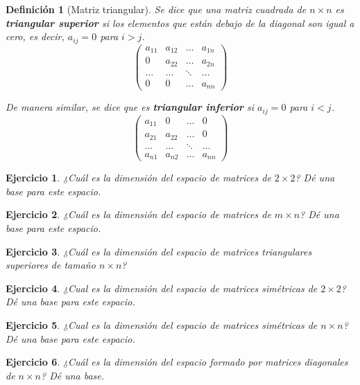 \documentclass[11pt]{report}
\theoremstyle{break}
\newtheorem{definicion}{Definición}[chapter]
\newtheorem{ejercicio}{Ejercicio}[chapter]
\theoremstyle{break}
\newcommand{\matdim}[2]{$#1 \times #2$}
\begin{document}
\begin{definicion}[Matriz triangular]
Se dice que una matriz cuadrada de \matdim{n}{n} es \textbf{triangular superior} si los elementos que están debajo de la diagonal son igual a cero, es decir, $a_{ij} = 0$ para $i > j$.
$$
\begin{pmatrix}
a_{11} & a_{12} & \ldots & a_{1n} \\
0 & a_{22} & \ldots & a_{2n} \\
\ldots & \ldots & \ddots & \ldots \\
0 & 0 & \ldots & a_{nn}
\end{pmatrix}
$$

De manera similar, se dice que es \textbf{triangular inferior} si $a_{ij} = 0$ para $i < j$.
$$
\begin{pmatrix}
a_{11} & 0 & \ldots & 0 \\
a_{21} & a_{22} & \ldots & 0 \\
\ldots & \ldots & \ddots & \ldots \\
a_{n1} & a_{n2} & \ldots & a_{nn}
\end{pmatrix}
$$
\end{definicion}

\begin{ejercicio}
¿Cuál es la dimensión del espacio de matrices de \matdim{2}{2}? Dé una base para este espacio.
\end{ejercicio}

\begin{ejercicio}
¿Cuál es la dimensión del espacio de matrices de \matdim{m}{n}? Dé una base para este espacio.
\end{ejercicio}

\begin{ejercicio}
¿Cuál es la dimensión del espacio de matrices triangulares superiores de tamaño \matdim{n}{n}?
\end{ejercicio}

\begin{ejercicio}
¿Cual es la dimensión del espacio de matrices simétricas de \matdim{2}{2}? Dé una base para este espacio.
\end{ejercicio}

\begin{ejercicio}
¿Cual es la dimensión del espacio de matrices simétricas de \matdim{n}{n}? Dé una base para este espacio.
\end{ejercicio}

\begin{ejercicio}
¿Cuál es la dimensión del espacio formado por matrices diagonales de \matdim{n}{n}? Dé una base.
\end{ejercicio}
\end{document}
